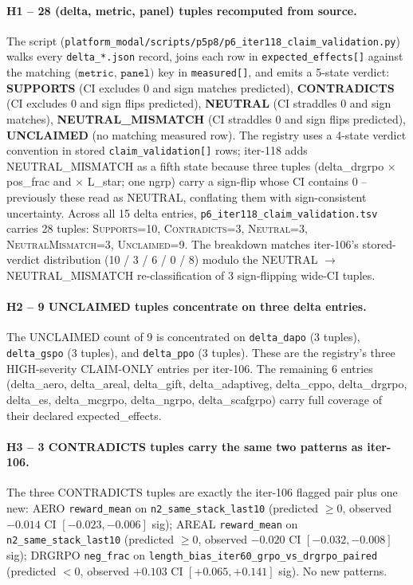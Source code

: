 \documentclass{article}
\begin{document}
\paragraph{H1 -- 28 (delta, metric, panel) tuples recomputed from source.}
The script (\texttt{platform_modal/scripts/p5p8/p6\_iter118\_claim\_validation.py}) walks
every \texttt{delta\_*.json} record, joins each row in
\texttt{expected\_effects[]} against the matching $\texttt{(metric, panel)}$
key in \texttt{measured[]}, and emits a 5-state verdict:
\textbf{SUPPORTS} (CI excludes 0 and sign matches predicted),
\textbf{CONTRADICTS} (CI excludes 0 and sign flips predicted),
\textbf{NEUTRAL} (CI straddles 0 and sign matches),
\textbf{NEUTRAL\_MISMATCH} (CI straddles 0 and sign flips predicted),
\textbf{UNCLAIMED} (no matching measured row). The registry uses a 4-state
verdict convention in stored \texttt{claim\_validation[]} rows; iter-118
adds NEUTRAL\_MISMATCH as a fifth state because three tuples (delta\_drgrpo
$\times$ pos\_frac and $\times$ L\_star; one ngrp) carry a sign-flip whose
CI contains 0 -- previously these read as NEUTRAL, conflating them with
sign-consistent uncertainty. Across all 15 delta entries,
\texttt{p6\_iter118\_claim\_validation.tsv} carries 28 tuples:
\textsc{Supports}=10, \textsc{Contradicts}=3, \textsc{Neutral}=3,
\textsc{NeutralMismatch}=3, \textsc{Unclaimed}=9.
The breakdown matches iter-106's stored-verdict distribution (10 / 3 / 6 /
0 / 8) modulo the NEUTRAL $\to$ NEUTRAL\_MISMATCH re-classification of 3
sign-flipping wide-CI tuples.

\paragraph{H2 -- 9 UNCLAIMED tuples concentrate on three delta entries.}
The UNCLAIMED count of 9 is concentrated on \texttt{delta\_dapo}
(3 tuples), \texttt{delta\_gspo} (3 tuples), and \texttt{delta\_ppo}
(3 tuples). These are the registry's three HIGH-severity CLAIM-ONLY
entries per iter-106. The remaining 6 entries (delta\_aero, delta\_areal,
delta\_gift, delta\_adaptiveg, delta\_cppo, delta\_drgrpo, delta\_es,
delta\_mcgrpo, delta\_ngrpo, delta\_scafgrpo) carry full coverage of
their declared expected\_effects.

\paragraph{H3 -- 3 CONTRADICTS tuples carry the same two patterns as iter-106.}
The three CONTRADICTS tuples are exactly the iter-106 flagged pair plus
one new: AERO \texttt{reward\_mean} on \texttt{n2\_same\_stack\_last10}
(predicted $\geq 0$, observed $-0.014$ CI $[-0.023, -0.006]$ sig);
AREAL \texttt{reward\_mean} on \texttt{n2\_same\_stack\_last10}
(predicted $\geq 0$, observed $-0.020$ CI $[-0.032, -0.008]$ sig);
DRGRPO \texttt{neg\_frac} on
\texttt{length\_bias\_iter60\_grpo\_vs\_drgrpo\_paired}
(predicted $< 0$, observed $+0.103$ CI $[+0.065, +0.141]$ sig). No new
patterns.
\end{document}
